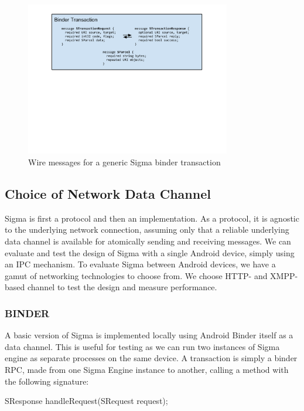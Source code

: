 \documentclass[prodmode]{acmlarge}
\begin{document}
\begin{figure}[h!]
\centering
\includegraphics[width=0.8\textwidth]{drawings/WireBinderTransaction.pdf}
\caption{Wire messages for a generic Sigma binder transaction}
\label{fig:GenericSigmaBinderTransaction}
\end{figure}

\subsection{Choice of Network Data Channel}
Sigma is first a protocol and then an implementation. As a protocol, it is agnostic to the underlying network connection, assuming only that a reliable underlying data channel is available for atomically sending and receiving messages. We can evaluate and test the design of Sigma with a single Android device, simply using an IPC mechanism. To evaluate Sigma between Android devices, we have a gamut of networking technologies to choose from. We choose HTTP- and XMPP- based channel to test the design and measure performance.

\subsubsection{BINDER}
A basic version of Sigma is implemented locally using Android Binder itself as a data channel. This is useful for testing as we can run two instances of Sigma engine as separate processes on the same device. A transaction is simply a binder RPC, made from one Sigma Engine instance to another, calling a method with the following signature:

\begin{snippet}
SResponse handleRequest(SRequest request);
\end{snippet}
\end{document}
